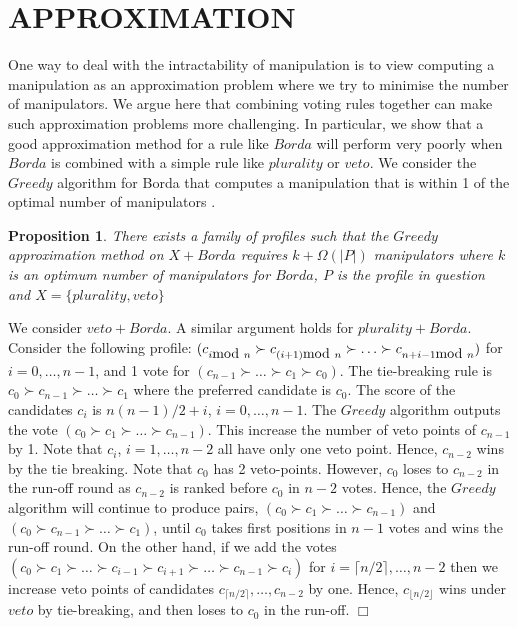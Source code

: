 \documentclass{ecai2012}
\newcommand{\mytext}[1]{\mbox{\rm #1}}
\newcommand{\winner}[2]{\mbox{$#1 + #2$}}
\newtheorem{proposition}{Proposition}
\newcommand{\myproof}{\vspace{-3mm}\noindent {\bf Proof:\ \ }}
\newcommand{\myqed}{\mbox{$\Box$}}
\begin{document}
\section{APPROXIMATION}

One way to deal with the
intractability of manipulation is to view
computing a manipulation as an approximation problem where we try to
minimise the number of manipulators. %
We argue here that combining
voting rules together can make
such approximation problems more
challenging. In particular, we show that
a good approximation method for
a rule like $Borda$ will perform
very poorly when $Borda$ is combined with
a simple rule like $plurality$ or $veto$.
We consider the $Greedy$ algorithm for
Borda that computes a manipulation that
is within 1 of the optimal
number of manipulators \cite{zuckermanSODA08}. %

\begin{proposition}
There exists a family of profiles such that the
$Greedy$ approximation method
on $\winner{X}{Borda}$ requires
$k + \Omega(|P|)$ manipulators where $k$ is an
optimum number of manipulators for $Borda$, $P$ is
the profile in question and $X = \{plurality, veto\}$
\end{proposition}
\myproof
We consider $\winner{veto}{Borda}$. A similar
argument holds for $\winner{plurality}{Borda}$.
Consider the following profile:
$(c_{i\mytext{ mod } n} \succ c_{(i+1)\mytext{ mod } n}\succ \ldots \succ c_{n+i-1 \mytext{ mod } n})$ for $i=0,\ldots,n-1$,
and 1 vote
for $(c_{n-1}\succ \ldots  \succ c_{1} \succ c_0)$.
The tie-breaking rule is $c_0 \succ c_{n-1} \succ \ldots \succ
c_{1}$ where
the preferred candidate is $c_0$.
The score of the candidates $c_i$ is $n(n-1)/2 + i$, $i=0,\ldots,n-1$.
The $Greedy$ algorithm outputs the vote
$(c_0 \succ c_1 \succ \ldots  \succ  c_{n-1})$.
This increase the number of veto points of $c_{n-1}$ by 1.
Note that $c_i$, $i=1,\ldots,n-2$ all have only one veto point.
Hence, $c_{n-2}$ wins by the tie breaking.
Note that $c_0$ has 2 veto-points.
However, $c_0$ loses to $c_{n-2}$ in the run-off round
as $c_{n-2}$ is ranked before $c_0$ in $n-2$ votes.
Hence, the $Greedy$ algorithm will continue to produce pairs,
$(c_0 \succ c_1\succ \ldots  \succ c_{n-1})$ and
$(c_0 \succ c_{n-1}\succ \ldots  \succ c_{1})$,
until $c_0$ takes first positions in $n-1$ votes and wins the run-off round.
On the other hand, if we add the votes
$(c_0 \succ c_1 \succ \ldots \succ  c_{i-1} \succ c_{i+1} \succ \ldots \succ  c_{n-1} \succ c_i)$ for $i=\lceil n/2 \rceil,\ldots, n-2$
then we increase veto points of candidates $c_{\lceil n/2 \rceil}, \ldots, c_{n-2}$ by one.
Hence, $c_{\lfloor n/2 \rfloor}$ wins under $veto$
by tie-breaking, and then loses to  $c_0$  in
the run-off.
\myqed
\end{document}

